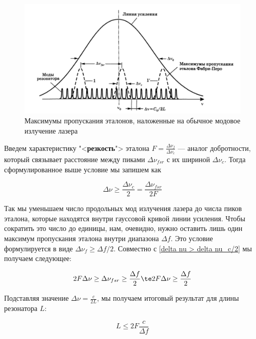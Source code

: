 \documentclass[12pt]{kiarticle}
\begin{document}
\begin{figure}[h!]
 	\centering
 	\includegraphics[width=\linewidth]{selection}
 	\caption{{\small Максимумы пропускания эталонов, наложенные на обычное модовое излучение лазера}}
 	\label{selection}
\end{figure}

Введем характеристику "<\textbf{резкость}"> эталона $ F = \frac{\Delta \nu_f}{\Delta \nu_c} $ --- аналог добротности, который связывает расстояние между пиками $ \Delta \nu_{fsr} $ с их шириной $ \Delta \nu_c $. Тогда сформулированное выше условие мы запишем как

\begin{equation}\label{delta nu > delta nu_c/2}
\Delta \nu \geq \dfrac{\Delta \nu_c}{2} = \dfrac{\Delta \nu_{fsr}}{2F}
\end{equation}

Так мы уменьшаем число продольных мод излучения лазера до числа пиков эталона, которые находятся внутри гауссовой кривой линии усиления. Чтобы сократить это число до единицы, нам, очевидно, нужно оставить лишь один максимум пропускания эталона внутри диапазона $ \Delta f $. Это условие формулируется в виде $ \Delta \nu_f \geq \Delta f /2$. Совместно с \eqref{delta nu > delta nu_c/2}  мы получаем следующее:

\begin{equation}\label{}
2 F \Delta \nu \geq \Delta \nu_{fsr} \geq \dfrac{\Delta f}{2} \te 2 F \Delta \nu \geq \dfrac{\Delta f}{2}
\end{equation}

Подставляя значение $ \Delta \nu = \frac{c}{2L} $, мы получаем итоговый результат для длины резонатора $ L $:

\begin{equation}\label{}
L \leq 2F \dfrac{c}{\Delta f}
\end{equation}
\end{document}

